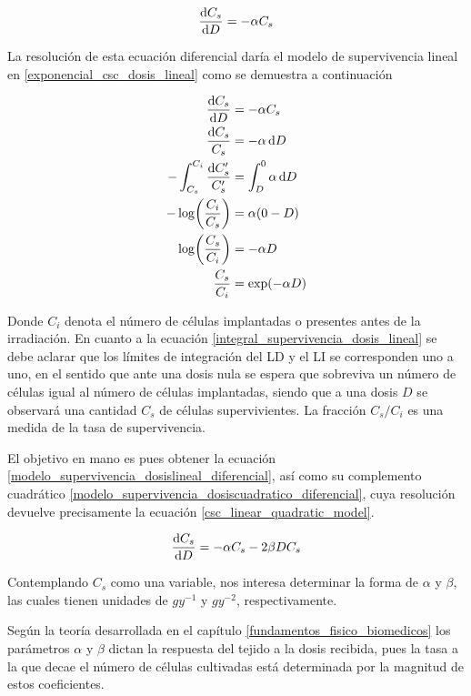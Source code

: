 \documentclass[12pt,letterpaper, oneside]{book}
\begin{document}
	\begin{equation}
		\dv{C_s}{D}=-\alpha C_s \label{modelo_supervivencia_dosislineal_diferencial}
	\end{equation}
	
	La resolución de esta ecuación diferencial daría el modelo de supervivencia lineal en \ref{exponencial_csc_dosis_lineal} como se demuestra a continuación
	
	\begin{align}
		\nonumber \dv{C_s}{D}&=-\alpha C_s\\
		\nonumber \frac{\dd{C_s}}{C_s}&=-\alpha \dd{D}\\
		-\int_{C_s}^{C_i} \frac{\dd{C_s'}}{C_s'}&=\int_{D}^{0} \alpha \dd{D}\label{integral_supervivencia_dosis_lineal}\\ 
		\nonumber -\log(\frac{C_i}{C_s})&=\alpha(0-D)\\
		\nonumber \log(\frac{C_s}{C_i})&=-\alpha D\\
		\nonumber \frac{C_s}{C_i}&=\exp(-\alpha D)
	\end{align}
	 
	Donde $C_i$ denota el número de células implantadas o presentes antes de la irradiación. En cuanto a la ecuación \ref{integral_supervivencia_dosis_lineal} se debe aclarar que los límites de integración del LD y el LI se corresponden uno a uno, en el sentido que ante una dosis nula se espera que sobreviva un número de células igual al número de células implantadas, siendo que a una dosis $D$ se observará una cantidad $C_s$ de células supervivientes. La fracción $C_s/C_i$ es una medida de la tasa de supervivencia.
	
	El objetivo en mano es pues obtener la ecuación \ref{modelo_supervivencia_dosislineal_diferencial}, así como su complemento cuadrático \ref{modelo_supervivencia_dosiscuadratico_diferencial}, cuya resolución devuelve precisamente la ecuación \ref{csc_linear_quadratic_model}.
	
	\begin{equation}
		\dv{C_s}{D}=-\alpha C_s -2\beta DC_s\label{modelo_supervivencia_dosiscuadratico_diferencial}
	\end{equation}
	
	Contemplando $C_s$ como una variable, nos interesa determinar la forma de $\alpha$ y $\beta$, las cuales tienen unidades de $\unit{gy^{-1}}$ y $\unit{gy^{-2}}$, respectivamente. 
	
	Según la teoría desarrollada en el capítulo \ref{fundamentos_fisico_biomedicos} los parámetros $\alpha$ y $\beta$ dictan la respuesta del tejido a la dosis recibida, pues la tasa a la que decae el número de células cultivadas está determinada por la magnitud de estos coeficientes. 
	
\end{document}

